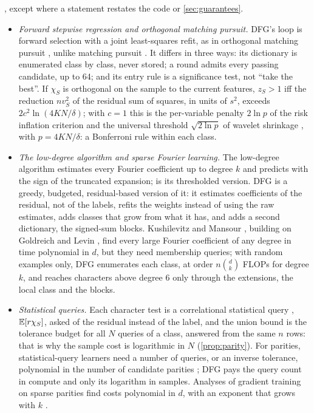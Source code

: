 , except where a statement restates the code or \cref{sec:guarantees}.
\begin{itemize}
\item \emph{Forward stepwise regression and orthogonal matching pursuit.} DFG's loop is forward selection with a joint least-squares refit, as in orthogonal matching pursuit \cite{pati1993orthogonal}, unlike matching pursuit \cite{mallat1993matching}. It differs in three ways: its dictionary is enumerated class by class, never stored; a round admits every passing candidate, up to 64; and its entry rule is a significance test, not ``take the best''. If $\chi_S$ is orthogonal on the sample to the current features, $z_S>1$ iff the reduction $nv_S^2$ of the residual sum of squares, in units of $s^2$, exceeds $2c^2\ln(4KN/\delta)$; with $c=1$ this is the per-variable penalty $2\ln p$ of the risk inflation criterion \cite{foster1994risk} and the universal threshold $\sqrt{2\ln p}$ of wavelet shrinkage \cite{donoho1994ideal}, with $p=4KN/\delta$: a Bonferroni rule within each class.
\item \emph{The low-degree algorithm and sparse Fourier learning.} The low-degree algorithm \cite{linial1993constant} estimates every Fourier coefficient up to degree $k$ and predicts with the sign of the truncated expansion;  is its thresholded version. DFG is a greedy, budgeted, residual-based version of it: it estimates coefficients of the residual, not of the labels, refits the weights instead of using the raw estimates, adds classes that grow from what it has, and adds a second dictionary, the signed-sum blocks. Kushilevitz and Mansour \cite{kushilevitz1993learning}, building on Goldreich and Levin \cite{goldreich1989hardcore}, find every large Fourier coefficient of any degree in time polynomial in $d$, but they need membership queries; with random examples only, DFG enumerates each class, at order $n\binom dk$ FLOPs for degree $k$, and reaches characters above degree 6 only through the extensions, the local class and the blocks.
\item \emph{Statistical queries.} Each character test is a correlational statistical query \cite{bshouty2002using,kearns1998sq}, $\mathbb{E}[r\chi_S]$, asked of the residual instead of the label, and the union bound is the tolerance budget for all $N$ queries of a class, answered from the same $n$ rows: that is why the sample cost is logarithmic in $N$ (\cref{prop:parity}). For parities, statistical-query learners need a number of queries, or an inverse tolerance, polynomial in the number of candidate parities \cite{blum1994weakly}; DFG pays the query count in compute and only its logarithm in samples. Analyses of gradient training on sparse parities find costs polynomial in $d$, with an exponent that grows with $k$ \cite{barak2022hidden,abbe2023leap}.

\end{itemize}
